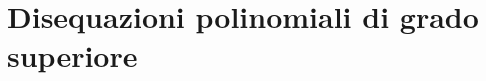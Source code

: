 % 
%  
% 
% 
% 

\section{Disequazioni polinomiali di grado superiore}
\label{sec:diseq_grado_superiore}

